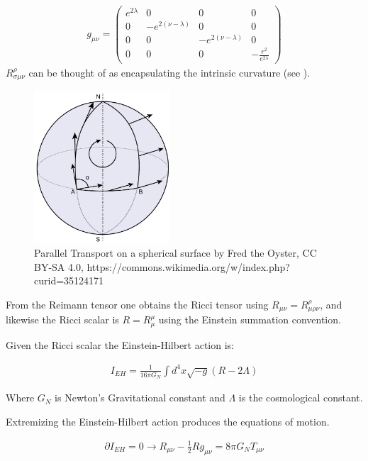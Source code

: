 \documentclass[12pt]{article}
\begin{document}
\begin{align}
  g_{\mu\nu}=\left(\begin{array}{cccc}
    e^{2\lambda} & 0 & 0 & 0\\
    0 & -e^{2\left(\nu-\lambda\right)} & 0 & 0\\
    0 & 0 & -e^{2\left(\nu-\lambda\right)} & 0\\
    0 & 0 & 0 & -\frac{r^{2}}{e^{2\lambda}}
    \end{array}\right)
\end{align}
$R^{\rho}_{\sigma\mu\nu}$ can be thought of as encapsulating the intrinsic curvature (see ).
\begin{figure}
  \centering
  \includegraphics[width=2in]{Parallel_Transport.pdf}
  \caption{Parallel Transport on a spherical surface by Fred the Oyster, CC BY-SA 4.0, https://commons.wikimedia.org/w/index.php?curid=35124171 \label{parallel-transport-figure}}
\end{figure}

From the Reimann tensor one obtains the Ricci tensor using $R_{\mu\nu}=R^{\rho}_{\mu\rho\nu}$, and likewise the Ricci scalar is $R=R^{\mu}_{\mu}$ using the Einstein summation convention.

Given the Ricci scalar the Einstein-Hilbert action is:

\begin{align}
I_{EH}=\frac{1}{16\pi G_{N}}\int d^{4}x\sqrt{-g}(R-2\Lambda)
\end{align}

Where $G_{N}$ is Newton's Gravitational constant and $\Lambda$ is the cosmological constant.

Extremizing the Einstein-Hilbert action produces the equations of motion.

\begin{align}
  \partial I_{EH} = 0 \rightarrow R_{\mu\nu}-\frac{1}{2}Rg_{\mu\nu}=8\pi G_{N}T_{\mu\nu}
\end{align}
\end{document}
